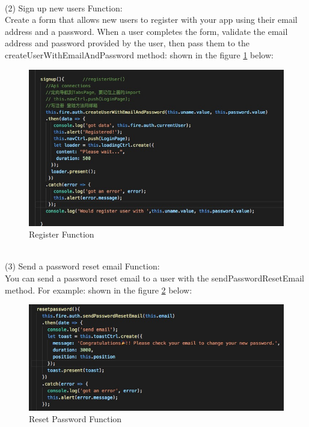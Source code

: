 \\ (2) Sign up new users Function: \\
Create a form that allows new users to register with your app using their email address and a password. When a user completes the form, validate the email address and password provided by the user, then pass them to the createUserWithEmailAndPassword method: shown in the figure \ref{fig:6.14 cubed graph} below:
\begin{figure}[h]
	\centering
	\includegraphics[scale=0.4]{img/Registerfunction.png}
	\caption{Register Function}
	\label{fig:6.14 cubed graph}
\end{figure}
\\
(3) Send a password reset email Function: \\
You can send a password reset email to a user with the sendPasswordResetEmail method. For example: shown in the figure \ref{fig:6.15 cubed graph} below:
\begin{figure}[h]
	\centering
	\includegraphics[scale=0.4]{img/resetPasswordfunction.png}
	\caption{Reset Password Function}
	\label{fig:6.15 cubed graph}
\end{figure}
\\ \\
